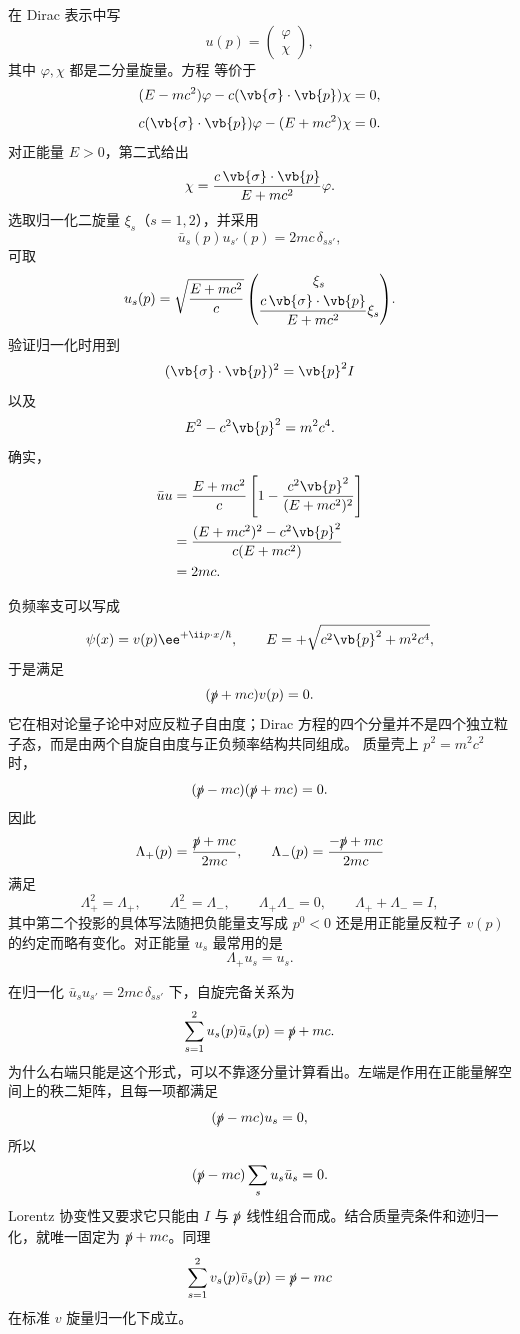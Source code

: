 在 Dirac 表示中写
\[
u(p)=\begin{pmatrix}\varphi\\\chi\end{pmatrix},
\]
其中 $\varphi,\chi$ 都是二分量旋量。方程  等价于
\[
(E-mc^2)\varphi-c(\vb{\sigma}\cdot\vb{p})\chi=0,
\]
\[
c(\vb{\sigma}\cdot\vb{p})\varphi-(E+mc^2)\chi=0.
\]
对正能量 $E>0$，第二式给出
\[
\chi=\frac{c\,\vb{\sigma}\cdot\vb{p}}{E+mc^2}\varphi.
\]
选取归一化二旋量 $\xi_s$（$s=1,2$），并采用
\[
\bar u_s(p)u_{s'}(p)=2mc\,\delta_{ss'},
\]
可取
\begin{equation*}{
u_s(p)
=\sqrt{\frac{E+mc^2}{c}}
\begin{pmatrix}
\xi_s\\[3pt]
\dfrac{c\,\vb{\sigma}\cdot\vb{p}}{E+mc^2}\xi_s
\end{pmatrix}
}.\end{equation*}
验证归一化时用到
\[
(\vb{\sigma}\cdot\vb{p})^2=\vb{p}^2I
\]
以及
\[
E^2-c^2\vb{p}^2=m^2c^4.
\]
确实，
\[
\begin{aligned}
\bar u u
&=\frac{E+mc^2}{c}\left[1-\frac{c^2\vb{p}^2}{(E+mc^2)^2}\right]\\
&=\frac{(E+mc^2)^2-c^2\vb{p}^2}{c(E+mc^2)}\\
&=2mc.
\end{aligned}
\]

负频率支可以写成
\[
\psi(x)=v(p)\ee^{+\ii p\cdot x/\hbar},
\qquad E=+\sqrt{c^2\vb{p}^2+m^2c^4},
\]
于是满足
\[
(\slashed p+mc)v(p)=0.
\]
它在相对论量子论中对应反粒子自由度；Dirac 方程的四个分量并不是四个独立粒子态，而是由两个自旋自由度与正负频率结构共同组成。
质量壳上 $p^2=m^2c^2$ 时，
\[
(\slashed p-mc)(\slashed p+mc)=0.
\]
因此
\[
\Lambda_+(p)=\frac{\slashed p+mc}{2mc},
\qquad
\Lambda_-(p)=\frac{-\slashed p+mc}{2mc}
\]
满足
\[
\Lambda_+^2=\Lambda_+,
\qquad
\Lambda_-^2=\Lambda_-,
\qquad
\Lambda_+\Lambda_-=0,
\qquad
\Lambda_++\Lambda_-=I,
\]
其中第二个投影的具体写法随把负能量支写成 $p^0<0$ 还是用正能量反粒子 $v(p)$ 的约定而略有变化。对正能量 $u_s$ 最常用的是
\[
\Lambda_+u_s=u_s.
\]

在归一化 $\bar u_su_{s'}=2mc\,\delta_{ss'}$ 下，自旋完备关系为
\begin{equation*}{
\sum_{s=1}^{2}u_s(p)\bar u_s(p)=\slashed p+mc
}.\end{equation*}
为什么右端只能是这个形式，可以不靠逐分量计算看出。左端是作用在正能量解空间上的秩二矩阵，且每一项都满足
\[
(\slashed p-mc)u_s=0,
\]
所以
\[
(\slashed p-mc)\sum_su_s\bar u_s=0.
\]
Lorentz 协变性又要求它只能由 $I$ 与 $\slashed p$ 线性组合而成。结合质量壳条件和迹归一化，就唯一固定为 $\slashed p+mc$。同理
\[
{
\sum_{s=1}^{2}v_s(p)\bar v_s(p)=\slashed p-mc
}
\]
在标准 $v$ 旋量归一化下成立。

